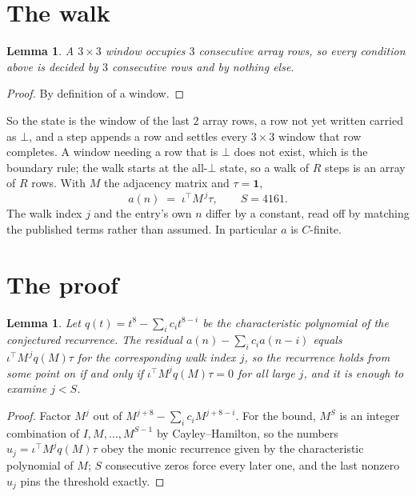 \documentclass[11pt,a4paper]{article}
\theoremstyle{plain}
\newtheorem{lemma}[theorem]{Lemma}
\theoremstyle{definition}
\begin{document}
\section{The walk}

\begin{lemma}\label{lem:win}
A $3\times3$ window occupies $3$ consecutive array rows, so every condition above is
decided by $3$ consecutive rows and by nothing else.
\end{lemma}

\begin{proof}
By definition of a window.
\end{proof}

So the state is the window of the last $2$ array rows, a row not yet written carried as
$\bot$, and a step appends a row and settles every $3\times3$ window that row completes. A
window needing a row that is $\bot$ does not exist, which is the boundary rule; the walk starts
at the all-$\bot$ state, so a walk of $R$ steps is an array of $R$ rows. With $M$ the adjacency
matrix and $\tau=\mathbf{1}$,
\[
a(n)\;=\;\iota^{\!\top}M^{\,j}\tau ,\qquad S=4161.
\]
The walk index $j$ and the entry's own $n$ differ by a constant, read off by matching the
published terms rather than assumed. In particular $a$ is $C$-finite.

\section{The proof}

\begin{lemma}\label{lem:crit}
Let $q(t)=t^{8}-\sum_i c_it^{8-i}$ be the characteristic polynomial of the
conjectured recurrence. The residual $a(n)-\sum_ic_ia(n-i)$ equals
$\iota^{\!\top}M^{\,j}q(M)\tau$ for the corresponding walk index $j$, so the recurrence
holds from some point on if and only if $\iota^{\!\top}M^{j}q(M)\tau=0$ for all large $j$,
and it is enough to examine $j<S$.
\end{lemma}

\begin{proof}
Factor $M^{j}$ out of $M^{j+8}-\sum_ic_iM^{j+8-i}$. For the bound, $M^{S}$
is an integer combination of $I,M,\dots,M^{S-1}$ by Cayley--Hamilton, so the numbers
$u_j=\iota^{\!\top}M^{j}q(M)\tau$ obey the monic recurrence given by the characteristic
polynomial of $M$; $S$ consecutive zeros force every later one, and the last nonzero $u_j$
pins the threshold exactly.
\end{proof}
\end{document}
